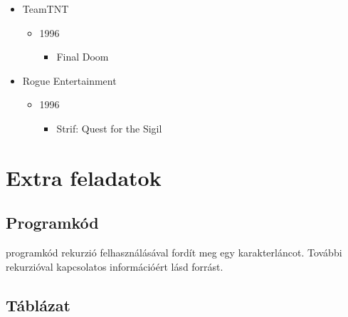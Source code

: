 \documentclass{thesis-ekf}
\theoremstyle{definition}
\theoremstyle{remark}
\begin{document}
\begin{itemize}
    \item TeamTNT
        \begin{itemize}
            \item 1996
                \begin{itemize}
                    \item Final Doom
                \end{itemize}
        \end{itemize}
    \item Rogue Entertainment
        \begin{itemize}
            \item 1996
                \begin{itemize}
                    \item Strif: Quest for the Sigil
                \end{itemize}
        \end{itemize}
\end{itemize}
\cite[A motort használó játékok]{doomengine}

\chapter{Extra feladatok}

\section{Programkód}


 programkód rekurzió felhasználásával fordít meg egy
karakterláncot. További rekurzióval kapcsolatos információért lásd
 forrást.

\section{Táblázat}
\end{document}
